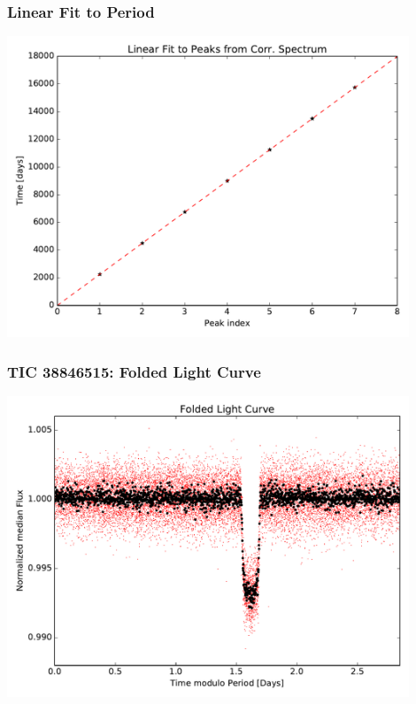 \documentclass[notes]{beamer}
\begin{document}
\begin{frame}
\frametitle{Linear Fit to Period}
\centering
\includegraphics[width=0.9\textwidth]{../figures/2019-1-15_16:2:14_linear_fit_TIC38846515.pdf}
\end{frame}

\begin{frame}
\frametitle{TIC 38846515: Folded Light Curve}
\centering
\includegraphics[width=0.9\textwidth]{../figures/2019-1-15_16:2:14_Folded_TIC38846515.pdf}
\end{frame}
\end{document}
